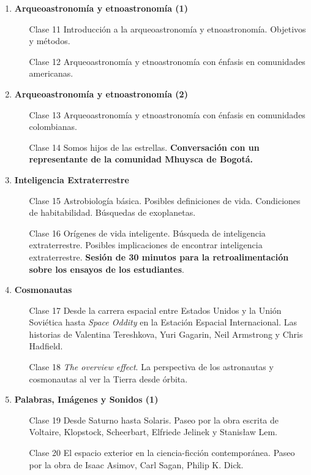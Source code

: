 \documentclass[12pt]{report}
\begin{document}
\begin{enumerate}
\item {\bf Arqueoastronom\'ia y etnoastronom\'ia (1)}
\begin{itemize}
\item[Clase 11] Introducci\'on a la arqueoastronom\'ia y
  etnoastronom\'ia. Objetivos y m\'etodos. 
\item[Clase 12] Arqueoastronom\'ia y etnoastronom\'ia con \'enfasis en
  comunidades americanas.
\end{itemize}

\item {\bf Arqueoastronom\'ia y etnoastronom\'ia (2)}
\begin{itemize}
\item[Clase 13] Arqueoastronom\'ia y etnoastronom\'ia con \'enfasis en
  comunidades colombianas.
\item[Clase 14] Somos hijos de las estrellas. {\bf Conversaci\'on con un
  representante de la comunidad Mhuysca de Bogot\'a.} 
\end{itemize}

\item {\bf Inteligencia Extraterrestre}
\begin{itemize}
\item[Clase 15] Astrobiolog\'ia b\'asica. Posibles definiciones de
  vida. Condiciones de habitabilidad. B\'usquedas de exoplanetas.
\item[Clase 16] Or\'igenes de vida inteligente.  B\'usqueda de
  inteligencia extraterrestre. Posibles implicaciones de encontrar
  inteligencia extraterrestre.
  {\bf Sesi\'on de 30 minutos para la retroalimentaci\'on sobre los
    ensayos de los estudiantes}. 
\end{itemize}

\item {\bf Cosmonautas}
\begin{itemize}
\item[Clase 17] Desde la carrera espacial entre Estados Unidos y la Uni\'on
  Sovi\'etica hasta \emph{Space Oddity} en la Estaci\'on Espacial
  Internacional. Las historias de Valentina Tereshkova, Yuri Gagarin,
  Neil Armstrong y Chris Hadfield.
\item[Clase 18] \emph{The overview effect}. La perspectiva de los
  astronautas y cosmonautas al ver la Tierra desde \'orbita.
\end{itemize}

\item {\bf Palabras, Im\'agenes y Sonidos (1)}
\begin{itemize}
\item[Clase 19] Desde Saturno hasta Solaris. Paseo por la obra escrita
  de Voltaire, Klopstock, Scheerbart, Elfriede Jelinek y Stanis\l aw Lem.
\item[Clase 20] El espacio exterior en la ciencia-ficci\'on
  contempor\'anea. Paseo por la obra de Isaac Asimov, Carl Sagan,
  Philip K. Dick. 
\end{itemize}


\end{enumerate}
\end{document}
